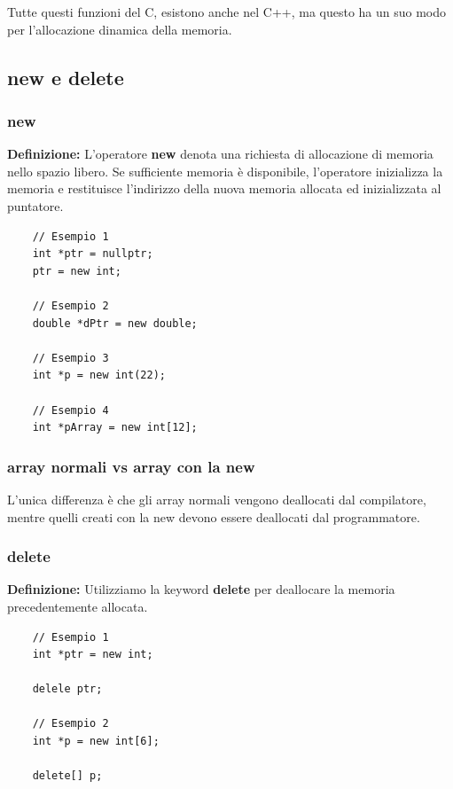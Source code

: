 \textsf{\small Tutte questi funzioni del C, esistono anche nel C++, ma questo ha un suo modo per l'allocazione dinamica della memoria.} \break

\subsection{new e delete}

\subsubsection{new}

\textsf{\small \textbf{Definizione: } L'operatore \textbf{new} denota una richiesta di allocazione di memoria nello spazio libero. Se sufficiente memoria è disponibile, l'operatore inizializza la memoria e restituisce l'indirizzo della nuova memoria allocata ed inizializzata al puntatore.} \\

\begin{lstlisting}
	// Esempio 1
	int *ptr = nullptr;
	ptr = new int;
	
	// Esempio 2
	double *dPtr = new double;
	
	// Esempio 3
	int *p = new int(22);
	
	// Esempio 4
	int *pArray = new int[12];
\end{lstlisting}

\subsubsection{array normali vs array con la new}

\textsf{\small L'unica differenza è che gli array normali vengono deallocati dal compilatore, mentre quelli creati con la new devono essere deallocati dal programmatore.} \break

\subsubsection{delete}

\textsf{\small \textbf{Definizione: } Utilizziamo la keyword \textbf{delete} per deallocare la memoria precedentemente allocata.} \\

\begin{lstlisting}
	// Esempio 1
	int *ptr = new int;
	
	delele ptr;
	
	// Esempio 2
	int *p = new int[6];
	
	delete[] p;
\end{lstlisting}

